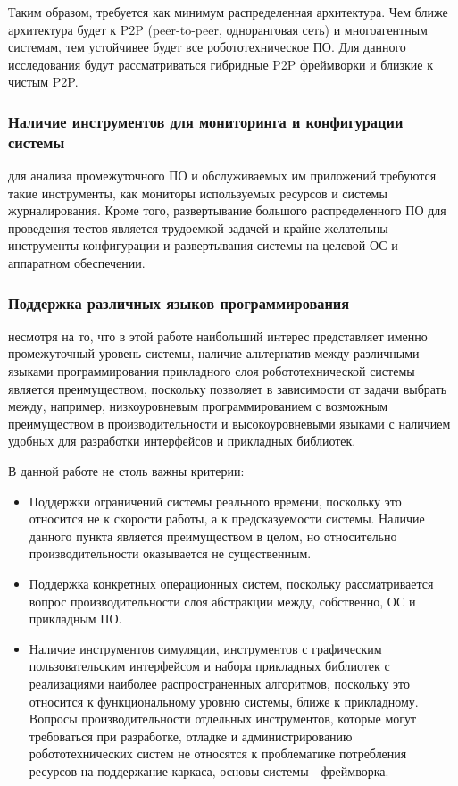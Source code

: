 Таким образом, требуется как минимум распределенная архитектура. Чем ближе архитектура будет к P2P (peer-to-peer, одноранговая сеть) и многоагентным системам, тем устойчивее будет все робототехническое ПО. Для данного исследования будут рассматриваться гибридные P2P фреймворки и близкие к чистым P2P.

\subsubsection{Наличие инструментов для мониторинга и конфигурации системы} для анализа промежуточного ПО и обслуживаемых им приложений требуются такие инструменты, как мониторы используемых ресурсов и системы журналирования. Кроме того, развертывание большого распределенного ПО для проведения тестов является трудоемкой задачей и крайне желательны инструменты конфигурации и развертывания системы на целевой ОС и аппаратном обеспечении.

\subsubsection{Поддержка различных языков программирования} несмотря на то, что в этой работе наибольший интерес представляет именно промежуточный уровень системы, наличие альтернатив между различными языками программирования прикладного слоя робототехнической системы является преимуществом, поскольку позволяет в зависимости от задачи выбрать между, например, низкоуровневым программированием с возможным преимуществом в производительности и высокоуровневыми языками с наличием удобных для разработки интерфейсов и прикладных библиотек.

В данной работе не столь важны критерии:
\begin{itemize}
	\item Поддержки ограничений системы реального времени, поскольку это относится не к скорости работы, а к предсказуемости системы. Наличие данного пункта является преимуществом в целом, но относительно производительности оказывается не существенным.
	\item Поддержка конкретных операционных систем, поскольку рассматривается вопрос производительности слоя абстракции между, собственно, ОС и прикладным ПО.
	\item Наличие инструментов симуляции, инструментов с графическим пользовательским интерфейсом и набора прикладных библиотек с реализациями наиболее распространенных алгоритмов, поскольку это относится к функциональному уровню системы, ближе к прикладному. Вопросы производительности отдельных инструментов, которые могут требоваться при разработке, отладке и администрированию робототехнических систем не относятся к проблематике потребления ресурсов на поддержание каркаса, основы системы - фреймворка.
\end{itemize}


